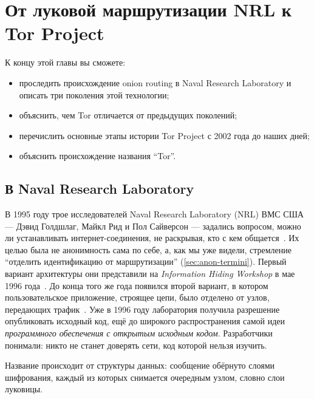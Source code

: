 \chapter{От луковой маршрутизации NRL к Tor Project}\label{cap:03-nascita-tor}

\begin{obiettivi}
К концу этой главы вы сможете:
\begin{itemize}[nosep]
  \item проследить происхождение onion routing в Naval Research Laboratory и описать три поколения этой технологии;
  \item объяснить, чем Tor отличается от предыдущих поколений;
  \item перечислить основные этапы истории Tor Project с 2002 года до наших дней;
  \item объяснить происхождение названия \enquote{Tor}.
\end{itemize}
\end{obiettivi}

\section{В Naval Research Laboratory}\label{sec:nascita-nrl}

В 1995 году трое исследователей Naval Research Laboratory (NRL) ВМС США --- Дэвид Голдшлаг, Майкл Рид и Пол Сайверсон --- задались вопросом, можно ли устанавливать интернет-соединения, не раскрывая, кто с кем общается~\cite{torhistory}. Их целью была не анонимность сама по себе, а, как мы уже видели, стремление \enquote{отделить идентификацию от маршрутизации} (\cref{sec:anon-termini}). Первый вариант архитектуры они представили на \emph{Information Hiding Workshop} в мае 1996 года~\cite{goldschlag1996hiding}. До конца того же года появился второй вариант, в котором пользовательское приложение, строящее цепи, было отделено от узлов, передающих трафик~\cite{syverson2011peel}. Уже в 1996 году лаборатория получила разрешение опубликовать исходный код, ещё до широкого распространения самой идеи \emph{программного обеспечения с открытым исходным кодом}. Разработчики понимали: никто не станет доверять сети, код которой нельзя изучить.

Название происходит от структуры данных: сообщение обёрнуто слоями шифрования, каждый из которых снимается очередным узлом, словно слои луковицы.


